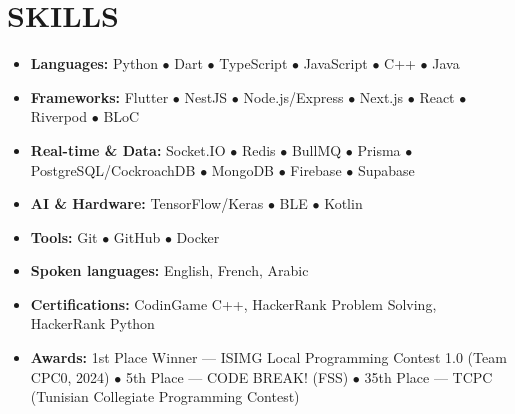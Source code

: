 \documentclass[10pt,a4paper]{article}
\begin{document}
\section*{SKILLS}
\begin{itemize}
  \item \textbf{Languages:} Python $\bullet$ Dart $\bullet$ TypeScript $\bullet$ JavaScript $\bullet$ C++ $\bullet$ Java
  \item \textbf{Frameworks:} Flutter $\bullet$ NestJS $\bullet$ Node.js/Express $\bullet$ Next.js $\bullet$ React $\bullet$ Riverpod $\bullet$ BLoC
  \item \textbf{Real-time \& Data:} Socket.IO $\bullet$ Redis $\bullet$ BullMQ $\bullet$ Prisma $\bullet$ PostgreSQL/CockroachDB $\bullet$ MongoDB $\bullet$ Firebase $\bullet$ Supabase
  \item \textbf{AI \& Hardware:} TensorFlow/Keras $\bullet$ BLE $\bullet$ Kotlin
  \item \textbf{Tools:} Git $\bullet$ GitHub $\bullet$ Docker
  \item \textbf{Spoken languages:} English, French, Arabic
  \item \textbf{Certifications:} CodinGame C++, HackerRank Problem Solving, HackerRank Python
  \item \textbf{Awards:} 1st Place Winner --- ISIMG Local Programming Contest 1.0 (Team CPC0, 2024) $\bullet$ 5th Place --- CODE BREAK! (FSS) $\bullet$ 35th Place --- TCPC (Tunisian Collegiate Programming Contest)
\end{itemize}
\end{document}
